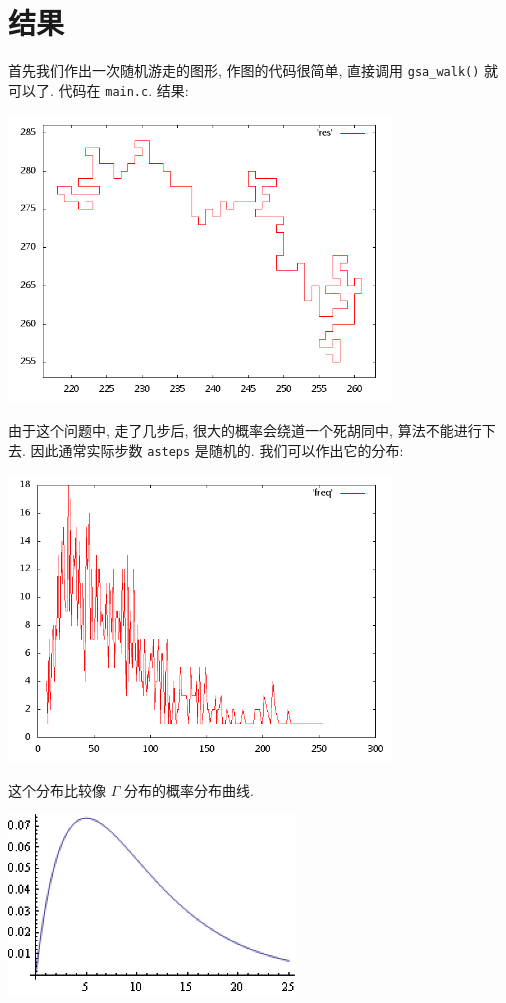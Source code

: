 \documentclass{ctexart}
\begin{document}
\section{结果}
首先我们作出一次随机游走的图形, 作图的代码很简单, 直接调用 \verb|gsa_walk()|
就可以了. 代码在 \verb|main.c|. 结果:
\begin{center}
\includegraphics[width=4in]{res.png}
\end{center}

由于这个问题中, 走了几步后, 很大的概率会绕道一个死胡同中, 算法不能进行下去.
因此通常实际步数 \verb|asteps| 是随机的. 我们可以作出它的分布:
\begin{center}
\includegraphics[width=4in]{freq.png}
\end{center}
这个分布比较像 $\Gamma$ 分布的概率分布曲线.
\begin{center}
\includegraphics[width=3in]{GammaDistribution.png}
\end{center}
\end{document}
